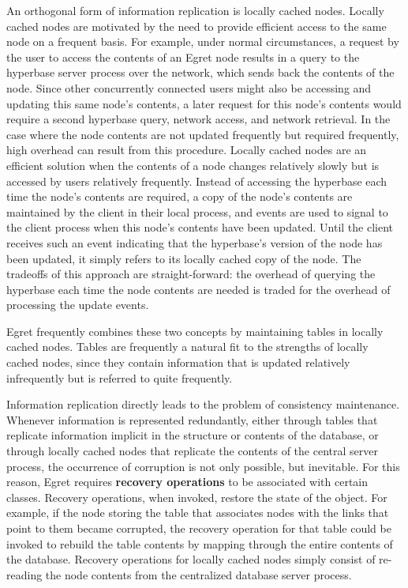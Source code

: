 An orthogonal form of information replication is locally cached
nodes.  Locally cached nodes are motivated by the need to provide 
efficient access to the same node on a frequent basis.  For example, 
under normal circumstances, a request by the user to access the 
contents of an Egret node results in a query to the hyperbase server
process over the network, which sends back the contents of the node.
Since other concurrently connected users might also be accessing and
updating this same node's contents, a later request for this node's 
contents would require a second hyperbase query, network access,
and network retrieval.  In the case where the node contents are not
updated frequently but required frequently,  high overhead can result
from this procedure.   Locally cached nodes are an efficient solution when
the contents of a node changes relatively slowly but is accessed 
by users relatively frequently.   Instead of accessing the hyperbase
each time the node's contents are required, a copy of the node's contents
are maintained by the client in their local process, and events are used
to signal to the client process when this node's contents have been
updated.  Until the client receives such an event indicating that the
hyperbase's version of the node has been updated, it simply refers to 
its locally cached copy of the node.  The tradeoffs of this approach
are straight-forward: the overhead of querying the hyperbase each
time the node contents are needed is traded for the overhead of 
processing the update events.  

Egret frequently combines these two concepts by maintaining
tables in locally cached nodes.   Tables are frequently a natural 
fit to the strengths of locally cached nodes, since they contain
information that is updated relatively infrequently but is referred
to quite frequently.  

Information replication directly leads to the problem of  consistency
maintenance.  Whenever information is represented redundantly, either
through tables that replicate information  implicit in the structure or
contents of the database, or through locally cached nodes that replicate the
contents of the central server process, the occurrence of corruption is not
only possible,  but inevitable.    For this reason, Egret requires {\bf recovery
operations} to be associated with certain classes.   Recovery operations, when
invoked, restore the  state of the object.  For example, if the node storing the
table that associates nodes with the links that point to them became
corrupted, the recovery operation for that table could be invoked to rebuild
the table contents by mapping through the entire contents of the database. 
Recovery operations for locally cached nodes simply consist of re-reading the
node contents from the centralized database server process. 


